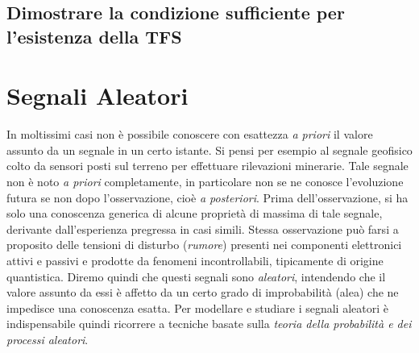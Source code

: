 \documentclass[12pt,oneside,openany]{memoir}
\numberwithin{equation}{subsection}
\begin{document}
\subsection{Dimostrare la condizione sufficiente per l'esistenza della TFS}


\newpage	
\section{Segnali Aleatori}
In moltissimi casi non \`e possibile conoscere con esattezza \textit{a priori}
il valore assunto da un segnale in un certo istante. Si pensi per esempio al
segnale geofisico colto da sensori posti sul terreno per effettuare rilevazioni
minerarie. Tale segnale non \`e noto \textit{a priori} completamente, in
particolare non se ne conosce l'evoluzione futura se non dopo l'osservazione,
cio\`e \textit{a posteriori}. Prima dell'osservazione, si ha solo una conoscenza
generica di alcune propriet\`a di massima di tale segnale, derivante
dall'esperienza pregressa in casi simili. Stessa osservazione pu\`o farsi a
proposito delle tensioni di disturbo (\textit{rumore}) presenti nei componenti
elettronici attivi e passivi e prodotte da fenomeni incontrollabili, tipicamente
di origine quantistica. Diremo quindi che questi segnali sono \textit{aleatori},
intendendo che il valore assunto da essi \`e affetto da un certo grado di
improbabilit\`a (alea) che ne impedisce una conoscenza esatta. 
Per modellare e studiare i segnali aleatori \`e indispensabile quindi ricorrere
a tecniche basate sulla \textit{teoria della probabilit\`a e dei processi
aleatori}.


\newpage
\end{document}
